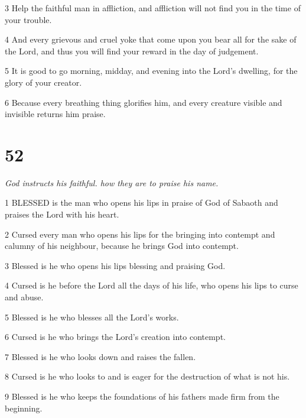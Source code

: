 \par 3 Help the faithful man in affliction, and affliction will not find you in the time of your trouble.

\par 4 And every grievous and cruel yoke that come upon you bear all for the sake of the Lord, and thus you will find your reward in the day of judgement.

\par 5 It is good to go morning, midday, and evening into the Lord's dwelling, for the glory of your creator.

\par 6 Because every breathing thing glorifies him, and every creature visible and invisible returns him praise.

\chapter{52}

\par \textit{God instructs his faithful. how they are to praise his name.}

\par 1 BLESSED is the man who opens his lips in praise of God of Sabaoth and praises the Lord with his heart.

\par 2 Cursed every man who opens his lips for the bringing into contempt and calumny of his neighbour, because he brings God into contempt.

\par 3 Blessed is he who opens his lips blessing and praising God.

\par 4 Cursed is he before the Lord all the days of his life, who opens his lips to curse and abuse.

\par 5 Blessed is he who blesses all the Lord's works.

\par 6 Cursed is he who brings the Lord's creation into contempt.

\par 7 Blessed is he who looks down and raises the fallen.

\par 8 Cursed is he who looks to and is eager for the destruction of what is not his.

\par 9 Blessed is he who keeps the foundations of his fathers made firm from the beginning.

